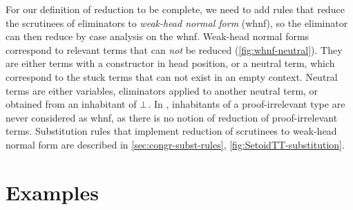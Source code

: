 For our definition of reduction to be complete, we need to add rules that
reduce the scrutinees of eliminators to {\em weak-head normal form} (whnf),
so the eliminator can then reduce by case analysis on the whnf.
%
Weak-head normal forms correspond to relevant terms that can \emph{not} be
reduced (\cref{fig:whnf-neutral}).
%
They are either terms with a constructor in head position, or a neutral term, which
correspond to the stuck terms that can not exist in an empty
context. Neutral terms are either variables, eliminators applied to another neutral
term, or obtained from an inhabitant of \( \bot \).
%
In \SetoidTT, inhabitants of a proof-irrelevant type are never
considered as whnf, as there is no notion of reduction of
proof-irrelevant terms.
%
Substitution rules that implement reduction of scrutinees to weak-head normal
form are described in \cref{sec:congr-subst-rules}, \cref{fig:SetoidTT-substitution}.

\section{Examples}
\label{sec:examples}

